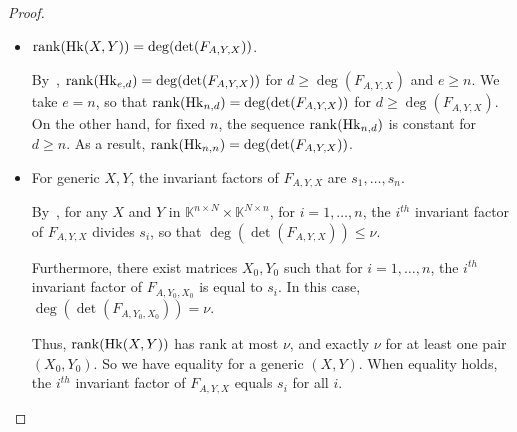 \documentclass[12pt]{article}
\def\K{\mathbb{K}}
\begin{document}
\begin{proof}
\begin{itemize}
\item ${\rm rank}({\rm Hk}(X,Y)) = \deg(\det(F_{A,Y,X}))$.

  By~\cite[Eq.~(2.6)]{KaVi04}, ${\rm rank}({\rm Hk}_{e,d}) =
  \deg(\det(F_{A,Y,X}))$ for $d \ge \deg(F_{A,Y,X})$ and $e \ge n$.
  We take $e=n$, so that ${\rm rank}({\rm Hk}_{n,d}) =
  \deg(\det(F_{A,Y,X}))$ for $d \ge \deg(F_{A,Y,X})$. On the other
  hand, for fixed $n$, the sequence ${\rm rank}({\rm Hk}_{n,d})$ is
  constant for $d \ge n$. As a result, 
 ${\rm rank}({\rm Hk}_{n,n}) =
  \deg(\det(F_{A,Y,X}))$.

\item For generic $X,Y$, the invariant factors of $ F_{A,Y,X}$ are
  $s_1,\dots,s_n$.

  By~\cite[Theorem~2.12]{KaVi04}, for any $X$ and $Y$ in $\K^{n\times N}
  \times \K^{N\times n}$, for $i=1,\dots,n$, the $i^{th}$ invariant
  factor of $F_{A,Y,X}$ divides $s_i$, so that $ \deg(\det(F_{A,Y,X}))\le\nu$.

  Furthermore, there exist matrices $X_0,Y_0$ such that for
  $i=1,\dots,n$, the $i^{th}$ invariant factor of $F_{A,Y_0,X_0}$ is
  equal to $s_i$. In this case,  $ \deg(\det(F_{A,Y_0,X_0}))=\nu$.

  Thus, ${\rm rank}({\rm Hk}(X,Y))$ has rank at most $\nu$, and
  exactly $\nu$ for at least one pair $(X_0,Y_0)$. So we have equality
  for a generic $(X,Y)$.  When equality holds, the $i^{th}$ invariant
  factor of $F_{A,Y,X}$ equals $s_i$ for all $i$.
\end{itemize}
\end{proof}










\end{document}
